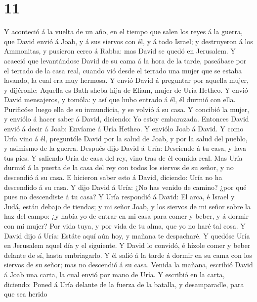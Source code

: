 \hypertarget{section-10}{%
\section{11}\label{section-10}}

 Y aconteció á la vuelta de un año, en el tiempo que salen
los reyes á la guerra, que David envió á Joab, y á sus siervos con él, y
á todo Israel; y destruyeron á los Ammonitas, y pusieron cerco á Rabba:
mas David se quedó en Jerusalem.  Y acaeció que
levantándose David de su cama á la hora de la tarde, paseábase por el
terrado de la casa real, cuando vió desde el terrado una mujer que se
estaba lavando, la cual era muy hermosa.  Y envió David á
preguntar por aquella mujer, y dijéronle: Aquella es Bath-sheba hija de
Eliam, mujer de Uría Hetheo.  Y envió David mensajeros, y
tomóla: y así que hubo entrado á él, él durmió con ella. Purificóse
luego ella de su inmundicia, y se volvió á su casa.  Y
concibió la mujer, y enviólo á hacer saber á David, diciendo: Yo estoy
embarazada.  Entonces David envió á decir á Joab: Envíame
á Uría Hetheo. Y enviólo Joab á David.  Y como Uría vino á
él, preguntóle David por la salud de Joab, y por la salud del pueblo, y
asimismo de la guerra.  Después dijo David á Uría:
Desciende á tu casa, y lava tus pies. Y saliendo Uría de casa del rey,
vino tras de él comida real.  Mas Uría durmió á la puerta
de la casa del rey con todos los siervos de su señor, y no descendió á
su casa.  E hicieron saber esto á David, diciendo: Uría
no ha descendido á su casa. Y dijo David á Uría: ¿No has venido de
camino? ¿por qué pues no descendiste á tu casa?  Y Uría
respondió á David: El arca, é Israel y Judá, están debajo de tiendas; y
mi señor Joab, y los siervos de mi señor sobre la haz del campo: ¿y
había yo de entrar en mi casa para comer y beber, y á dormir con mi
mujer? Por vida tuya, y por vida de tu alma, que yo no haré tal cosa.
 Y David dijo á Uría: Estáte aquí aún hoy, y mañana te
despacharé. Y quedóse Uría en Jerusalem aquel día y el siguiente.
 Y David lo convidó, é hízole comer y beber delante de
sí, hasta embriagarlo. Y él salió á la tarde á dormir en su cama con los
siervos de su señor; mas no descendió á su casa.  Venida
la mañana, escribió David á Joab una carta, la cual envió por mano de
Uría.  Y escribió en la carta, diciendo: Poned á Uría
delante de la fuerza de la batalla, y desamparadle, para que sea herido
